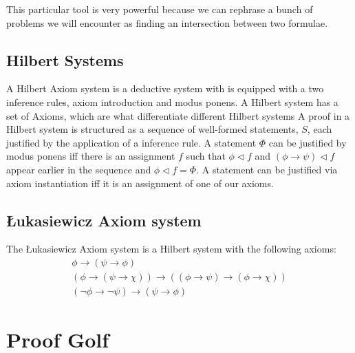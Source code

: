 \documentclass{article}
\begin{document}
This particular tool is very powerful because we can rephrase a bunch of problems we will encounter as finding an intersection between two formulae.

\subsection{Hilbert Systems}

A Hilbert Axiom system is a deductive system with is equipped with a two inference rules, axiom introduction and modus ponens.
A Hilbert system has a set of Axioms, which are what differentiate different Hilbert systems
A proof in a Hilbert system is structured as a sequence of well-formed statements, $S$, each justified by the application of a inference rule.
A statement $\Phi$ can be justified by modus ponens iff there is an assignment $f$ such that $\phi\lhd f$ and $(\phi\rightarrow\psi)\lhd f$ appear earlier in the sequence and
$\phi\lhd f=\Phi$.
A statement can be justified via axiom instantiation iff it is an assignment of one of our axioms.

\subsection{\L ukasiewicz Axiom system}
The \L ukasiewicz Axiom system is a Hilbert system with the following axioms:
\begin{gather*}
\phi \rightarrow (\psi \rightarrow \phi) \\
(\phi\rightarrow(\psi\rightarrow\chi))\rightarrow((\phi\rightarrow\psi)\rightarrow(\phi\rightarrow\chi)) \\
(\neg\phi\rightarrow\neg\psi)\rightarrow(\psi\rightarrow\phi)
\end{gather*}

\section{Proof Golf}
\end{document}
